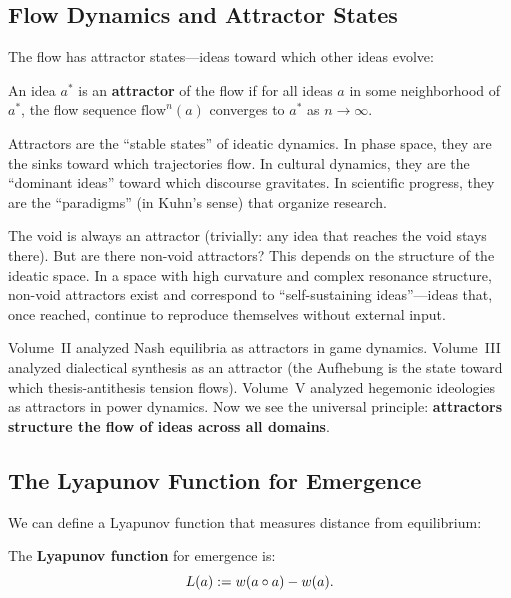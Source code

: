 \subsection{Flow Dynamics and Attractor States}

The flow has attractor states---ideas toward which other ideas evolve:

\begin{definition}[Attractor]
\label{def:attractor}
An idea $a^*$ is an \textbf{attractor} of the flow if for all ideas $a$ in
some neighborhood of $a^*$, the flow sequence $\text{flow}^n(a)$ converges
to $a^*$ as $n \to \infty$.
\end{definition}

\begin{interpretation}
Attractors are the ``stable states'' of ideatic dynamics. In phase space, they
are the sinks toward which trajectories flow. In cultural dynamics, they are
the ``dominant ideas'' toward which discourse gravitates. In scientific
progress, they are the ``paradigms'' (in Kuhn's sense) that organize research.

The void is always an attractor (trivially: any idea that reaches the void
stays there). But are there non-void attractors? This depends on the structure
of the ideatic space. In a space with high curvature and complex resonance
structure, non-void attractors exist and correspond to ``self-sustaining
ideas''---ideas that, once reached, continue to reproduce themselves without
external input.

Volume~II analyzed Nash equilibria as attractors in game dynamics. Volume~III
analyzed dialectical synthesis as an attractor (the Aufhebung is the state
toward which thesis-antithesis tension flows). Volume~V analyzed hegemonic
ideologies as attractors in power dynamics. Now we see the universal principle:
\textbf{attractors structure the flow of ideas across all domains}.
\end{interpretation}

\subsection{The Lyapunov Function for Emergence}

We can define a Lyapunov function that measures distance from equilibrium:

\begin{definition}
\label{def:lyapunov}
The \textbf{Lyapunov function} for emergence is:
\[
  L(a) := w(a \circ a) - w(a).
\]
\end{definition}

